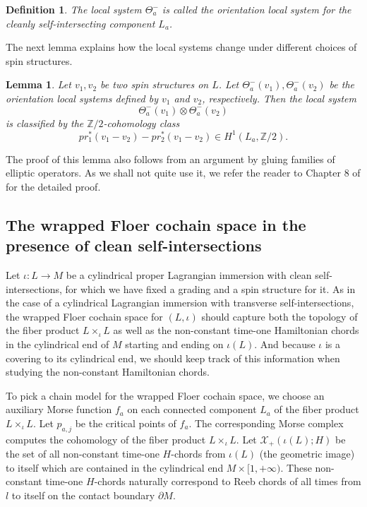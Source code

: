 \documentclass{amsart}
\newtheorem{definition}[theorem]{Definition}
\newtheorem{lemma}[theorem]{Lemma}
\numberwithin{equation}{section}
\numberwithin{figure}{section}
\begin{document}
\begin{definition}
	The local system $\Theta_{a}^{-}$ is called the orientation local system for the cleanly self-intersecting component $L_{a}$.
\end{definition}

	The next lemma explains how the local systems change under different choices of spin structures. \par

\begin{lemma}
	Let $v_{1}, v_{2}$ be two spin structures on $L$. Let $\Theta_{a}^{-}(v_{1}), \Theta_{a}^{-}(v_{2})$ be the orientation local systems defined by $v_{1}$ and $v_{2}$, respectively. Then the local system
\begin{equation*}
\Theta_{a}^{-}(v_{1}) \otimes \Theta_{a}^{-}(v_{2})
\end{equation*}
is classified by the $\mathbb{Z}/2$-cohomology class
\begin{equation}
pr_{1}^{*}(v_{1} - v_{2}) - pr_{2}^{*}(v_{1} - v_{2}) \in H^{1}(L_{a}, \mathbb{Z}/2).
\end{equation}
\end{lemma}

	The proof of this lemma also follows from an argument by gluing families of elliptic operators. As we shall not quite use it, we refer the reader to Chapter 8 of \cite{FOOO2} for the detailed proof. \par

\subsection{The wrapped Floer cochain space in the presence of clean self-intersections}\label{section: wrapped Floer cochain space in case of clean self-intersections}
	Let $\iota: L \to M$ be a cylindrical proper Lagrangian immersion with clean self-intersections, for which we have fixed a grading and a spin structure for it. As in the case of a cylindrical Lagrangian immersion with transverse self-intersections, the wrapped Floer cochain space for $(L, \iota)$ should capture both the topology of the fiber product $L \times_{\iota} L$ as well as the non-constant time-one Hamiltonian chords in the cylindrical end of $M$ starting and ending on $\iota(L)$. And because $\iota$ is a covering to its cylindrical end, we should keep track of this information when studying the non-constant Hamiltonian chords. \par
	To pick a chain model for the wrapped Floer cochain space, we choose an auxiliary Morse function $f_{a}$ on each connected component $L_{a}$ of the fiber product $L \times_{\iota} L$. Let $p_{a, j}$ be the critical points of $f_{a}$. The corresponding Morse complex computes the cohomology of the fiber product $L \times_{\iota} L$. Let $\mathcal{X}_{+}(\iota(L); H)$ be the set of all non-constant time-one $H$-chords from $\iota(L)$ (the geometric image) to itself which are contained in the cylindrical end $M \times [1, +\infty)$. These non-constant time-one $H$-chords naturally correspond to Reeb chords of all times from $l$ to itself on the contact boundary $\partial M$. \par
\end{document}
